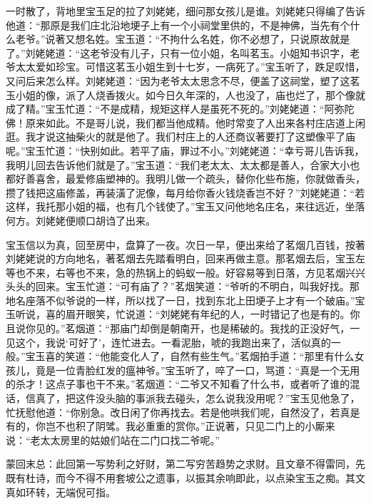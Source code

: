 \begin{parag}
    一时散了，背地里宝玉足的拉了刘姥姥，细问那女孩儿是谁。刘姥姥只得编了告诉他道：“那原是我们庄北沿地埂子上有一个小祠堂里供的，不是神佛，当先有个什么老爷。”说著又想名姓。宝玉道：“不拘什么名姓，你不必想了，只说原故就是了。”刘姥姥道：“这老爷没有儿子，只有一位小姐，名叫茗玉。小姐知书识字，老爷太太爱如珍宝。可惜这茗玉小姐生到十七岁，一病死了。”宝玉听了，跌足叹惜，又问后来怎么样。刘姥姥道：“因为老爷太太思念不尽，便盖了这祠堂，塑了这茗玉小姐的像，派了人烧香拨火。如今日久年深的，人也没了，庙也烂了，那个像就成了精。”宝玉忙道：“不是成精，规矩这样人是虽死不死的。”刘姥姥道：“阿弥陀佛！原来如此。不是哥儿说，我们都当他成精。他时常变了人出来各村庄店道上闲逛。我才说这抽柴火的就是他了。我们村庄上的人还商议著要打了这塑像平了庙呢。”宝玉忙道：“快别如此。若平了庙，罪过不小。”刘姥姥道：“幸亏哥儿告诉我，我明儿回去告诉他们就是了。”宝玉道：“我们老太太、太太都是善人，合家大小也都好善喜舍，最爱修庙塑神的。我明儿做一个疏头，替你化些布施，你就做香头，攒了钱把这庙修盖，再装潢了泥像，每月给你香火钱烧香岂不好？”刘姥姥道：“若这样，我托那小姐的福，也有几个钱使了。”宝玉又问他地名庄名，来往远近，坐落何方。刘姥姥便顺口胡诌了出来。
\end{parag}


\begin{parag}
    宝玉信以为真，回至房中，盘算了一夜。次日一早，便出来给了茗烟几百钱，按著刘姥姥说的方向地名，著茗烟去先踏看明白，回来再做主意。那茗烟去后，宝玉左等也不来，右等也不来，急的热锅上的蚂蚁一般。好容易等到日落，方见茗烟兴兴头头的回来。宝玉忙道：“可有庙了？”茗烟笑道：“爷听的不明白，叫我好找。那地名座落不似爷说的一样，所以找了一日，找到东北上田埂子上才有一个破庙。”宝玉听说，喜的眉开眼笑，忙说道：“刘姥姥有年纪的人，一时错记了也是有的。你且说你见的。”茗烟道：“那庙门却倒是朝南开，也是稀破的。我找的正没好气，一见这个，我说‘可好了’，连忙进去。一看泥胎，唬的我跑出来了，活似真的一般。”宝玉喜的笑道：“他能变化人了，自然有些生气。”茗烟拍手道：“那里有什么女孩儿，竟是一位青脸红发的瘟神爷。”宝玉听了，啐了一口，骂道：“真是一个无用的杀才！这点子事也干不来。”茗烟道：“二爷又不知看了什么书，或者听了谁的混话，信真了，把这件没头脑的事派我去碰头，怎么说我没用呢？”宝玉见他急了，忙抚慰他道：“你别急。改日闲了你再找去。若是他哄我们呢，自然没了，若真是有的，你岂不也积了阴骘。我必重重的赏你。”正说著，只见二门上的小厮来说：“老太太房里的姑娘们站在二门口找二爷呢。”
\end{parag}


\begin{parag}
    \begin{note}蒙回末总：此回第一写势利之好财，第二写穷苦趋势之求财。且文章不得雷同，先既有杜诗，而今不得不用套坡公之遗事，以振其余响即此，以点染宝玉之痴。其文真如环转，无端倪可指。\end{note}
\end{parag}

